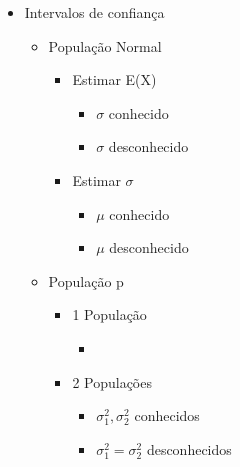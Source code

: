 \documentclass{article}
\begin{document}
\begin{multicols*}{2}
\begin{itemize}
    \vfill\null
    \columnbreak

    \item Intervalos de confiança
    \begin{itemize}
        \item População Normal
        \begin{itemize}
            \item Estimar E(X)
            \begin{itemize}
                \item $\sigma$ conhecido
                \item $\sigma$ desconhecido
            \end{itemize}
            \item Estimar $\sigma$
            \begin{itemize}
                \item $\mu$ conhecido
                \item $\mu$ desconhecido
            \end{itemize}
        \end{itemize}
        \item População p
        \begin{itemize}
            \item 1 População
            \begin{itemize}
                \item
            \end{itemize}
            \item 2 Populações
            \begin{itemize}
                \item $\sigma_1^2, \sigma_2^2$ conhecidos
                \item $\sigma_1^2 = \sigma_2^2$ desconhecidos
            \end{itemize}
        \end{itemize}
    \end{itemize}
\end{itemize}
\end{multicols*}
\end{document}

